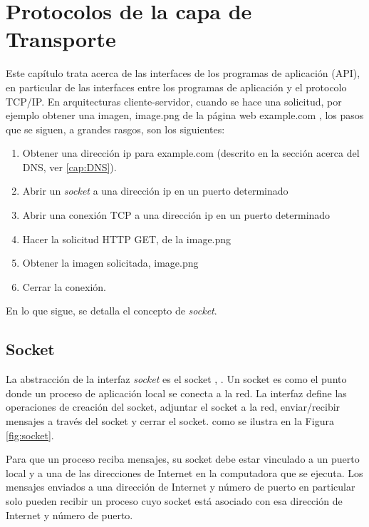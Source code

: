 

\chapter{Protocolos de la capa de Transporte }
\label{ch:Potocolos capa de Transporte}

Este capítulo trata acerca de las interfaces de los programas de aplicación (API), en particular de las interfaces entre los programas de aplicación y el protocolo TCP/IP.  
En arquitecturas cliente-servidor, cuando se hace una solicitud, por ejemplo obtener una imagen, image.png de la página web example.com ,  los pasos que se siguen, a grandes rasgos, son los siguientes:

\begin{enumerate}
	\item Obtener una dirección ip para example.com (descrito en la sección acerca del DNS, ver \ref{cap:DNS}).
	\item Abrir un \textit{socket} a una dirección ip en un puerto determinado
	\item Abrir una conexión TCP a una dirección ip en un puerto determinado
	\item Hacer la solicitud HTTP GET, de la image.png
	\item Obtener la imagen solicitada, image.png
	\item Cerrar la conexión.
\end{enumerate}
En lo que sigue, se detalla el concepto de  \textit{socket}.

\section{Socket} 

La abstracción de la interfaz \textit{socket} es el socket \cite{Comer2014}, \cite{Peterson2021}. Un socket es como el punto donde un proceso de aplicación local se conecta a la red. La interfaz define las operaciones de creación del socket, adjuntar el socket a la red, enviar/recibir mensajes a través del socket y cerrar el socket.  como se ilustra en la Figura \ref{fig:socket}.
 
Para que un proceso reciba mensajes, su socket debe estar vinculado a un puerto local y a una de las direcciones de Internet en la computadora  que se ejecuta. 
Los mensajes enviados a una dirección de Internet y número de puerto en particular solo pueden recibir un proceso cuyo socket está asociado con esa dirección de Internet y número de puerto.

